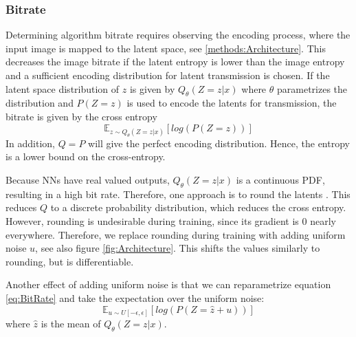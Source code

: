     \subsubsection{Bitrate}
        Determining algorithm bitrate requires observing the encoding
        process, where the input image is mapped to the
        latent space, see \ref{methods:Architecture}. This decreases the
        image bitrate if the latent entropy is lower than the image entropy and a sufficient encoding distribution for latent transmission is chosen. If the latent
        space distribution of $z$ is given by $Q_\theta(Z=z \vert x)$ where $\theta$
        parametrizes the distribution and $P(Z=z)$ is used to encode the latents for transmission, the bitrate is given by the cross entropy
        \begin{equation}\label{eq:BitRate}
            \mathbb{E}_{z \sim Q_\theta(Z=z \vert x)}[log(P(Z=z))]
        \end{equation}
        In addition, $Q=P$ will give the perfect encoding distribution. Hence, the
        entropy is a lower bound on the cross-entropy.

        Because NNs have real valued outputs, $Q_\theta(Z=z
        \vert x)$ is a continuous PDF, resulting in a high bit rate. Therefore, one
        approach is to round the latents \cite{DBLP:journals/corr/BalleLS16a}. This reduces $Q$ to a discrete
        probability distribution, which reduces the cross entropy. However, rounding
        is undesirable during training, since its gradient is 0 nearly everywhere. Therefore, we replace
        rounding during training with adding uniform noise $u$, see also
        figure \ref{fig:Architecture}. This shifts the values
        similarly to rounding, but is differentiable.

        Another effect of adding uniform noise is that we can reparametrize equation
        \ref{eq:BitRate} and take the expectation over the uniform noise:
        \begin{equation}
            \mathbb{E}_{u \sim U[-\epsilon, \epsilon]}[log(P(Z=\hat{z} + u))]
        \end{equation}
        where $\hat{z}$ is the mean of $Q_\theta(Z=z \vert x)$. \newline



